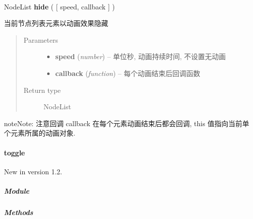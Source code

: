 \documentclass[letterpaper,10pt,english]{sphinxmanual}
\begin{document}
\begin{fulllineitems}
\label{api/core/node/hide:Node.hide}~
\begin{DUlineblock}{0em}
\item[] NodeList \textbf{hide} ( {[} speed, callback {]} )
\item[] 当前节点列表元素以动画效果隐藏
\end{DUlineblock}
\begin{quote}\begin{description}
\item[{Parameters}] \leavevmode\begin{itemize}
\item {}
\textbf{speed} (\emph{number}) -- 单位秒, 动画持续时间, 不设置无动画

\item {}
\textbf{callback} (\emph{function}) -- 每个动画结束后回调函数

\end{itemize}

\item[{Return type}] \leavevmode
NodeList

\end{description}\end{quote}

\begin{notice}{note}{Note:}
注意回调 callback 在每个元素动画结束后都会回调,  this 值指向当前单个元素所属的动画对象.
\end{notice}

\end{fulllineitems}



\paragraph{toggle}
\label{api/core/node/toggle:toggle}\label{api/core/node/toggle::doc}New in version 1.2.

\subparagraph{Module}
\label{api/core/node/toggle:module}\begin{quote}

{\hyperref[api/core/node/index:module-Node]{}}
\end{quote}


\subparagraph{Methods}
\label{api/core/node/toggle:methods}
\end{document}
